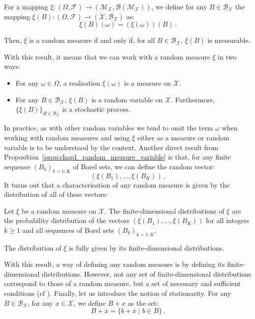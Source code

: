 \begin{proposition}{\parencite[Proposition 1.1.7]{Baccelli2020}}\label{prop:chap1_random_measure_variable}

    For a mapping $\xi:(\Omega, \mathcal{F}) \to (\mathcal{M}_{\mathcal{X}}, \mathcal{B}(\mathcal{M}_{\mathcal{X}}))$, we define for any $B\in\mathcal{B}_{\mathcal{X}}$ the mapping $\xi(B):(\Omega, \mathcal{F}) \to (\mathcal{X}, \mathcal{B}_{\mathcal{X}})$ as:
    \[\xi(B)(\omega) = (\xi(\omega))(B)\,.\]

    Then, $\xi$ is a random measure if and only if, for all $B\in\mathcal{B}_{\mathcal{X}}$, $\xi(B)$ is measurable.
\end{proposition}
With this result, it means that we can work with a random measure $\xi$ in two ways:
\begin{itemize}
    \item For any $\omega\in\Omega$, a realisation $\xi(\omega)$ is a measure on $\mathcal{X}$.
    \item For any $B\in\mathcal{B}_{\mathcal{X}}$, $\xi(B)$ is a random variable on $\mathcal{X}$. Furthermore, $\{\xi(B)\}_{B\in\mathcal{B}_{\mathcal{X}}}$ is a stochastic process.
\end{itemize}
In practice, as with other random variables we tend to omit the term $\omega$ when working with random measures and using $\xi$ either as a measure or random variable is to be understood by the context.
Another direct result from Proposition~\ref{prop:chap1_random_measure_variable} is that, for any finite sequence $(B_k)_{k=1:K}$ of Borel sets, we can define the random vector:
\[(\xi(B_1), \ldots, \xi(B_K))\,.\]
It turns out that a characterisation of any random measure is given by the distribution of all of these vectors:

\begin{proposition}{\parencite[Corollary 9.2.IV]{DaleyV2}}

    Let $\xi$ be a random measure on $\mathcal{X}$. 
    The finite-dimensional distributions of $\xi$ are the probability distribution of the vectors $(\xi(B_1), \ldots, \xi(B_K))$ for all integers $k\geq 1$ and all sequences of Borel sets $(B_k)_{k=1:K}$.

    The distribution of $\xi$ is fully given by its finite-dimensional distributions.
\end{proposition}
With this result, a way of defining any random measure is by defining its finite-dimensional distributions.
However, not any set of finite-dimensional distributions correspond to those of a random measure, but a set of necessary and sufficient conditions (cf \parencite[Conditions 9.2.V-VI]{DaleyV2}).
Finally, let us introduce the notion of stationarity. 
For any $B\in\mathcal{B}_{\mathcal{X}}$, for any $x\in\mathcal{X}$, we define $B+x$ as the set:
\[B+x = \{b + x \mid b\in B\}\,.\]

